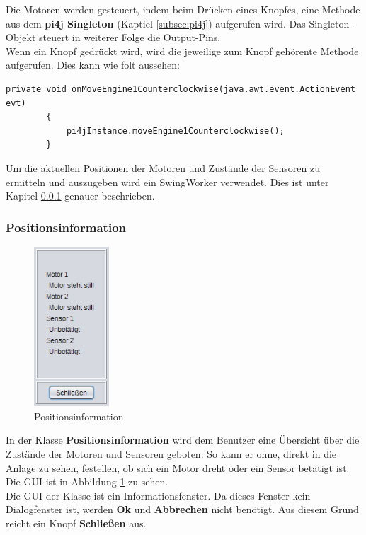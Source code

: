 Die Motoren werden gesteuert, indem beim Drücken eines Knopfes, eine Methode aus dem \textbf{pi4j Singleton} (Kaptiel \ref{subsec:pi4j}) aufgerufen wird. Das Singleton-Objekt steuert in weiterer Folge die Output-Pins.
\\ Wenn ein Knopf gedrückt wird, wird die jeweilige zum Knopf gehörente Methode aufgerufen. Dies kann wie folt aussehen:
\begin{lstlisting}[style=JavaStyle, caption=Motoren drehen] 
	private void onMoveEngine1Counterclockwise(java.awt.event.ActionEvent evt)                                               
    	{                                                   
        	pi4jInstance.moveEngine1Counterclockwise();
    	}  
\end{lstlisting}

\vspace{10pt}

Um die aktuellen Positionen der Motoren und Zustände der Sensoren zu ermitteln und auszugeben wird ein SwingWorker verwendet. Dies ist unter Kapitel \ref{subsubsec:Positionsinformation} genauer beschrieben.

\newpage

\subsubsection{Positionsinformation} \label{subsubsec:Positionsinformation}
\begin{figure}
\vspace{-20pt}
  \begin{center}
    \includegraphics[width=0.25\textwidth]{Bilder/GUI/Positionsinformation}
  \end{center}
  \caption{Positionsinformation}
  \label{Positionsinformation}
  \vspace{-10pt}
\end{figure}
In der Klasse \textbf{Positionsinformation} wird dem Benutzer eine Übersicht über die Zustände der Motoren und Sensoren geboten. So kann er ohne, direkt in die Anlage zu sehen, festellen, ob sich ein Motor dreht oder ein Sensor betätigt ist.
\\ Die GUI ist in Abbildung \ref{Positionsinformation} zu sehen.
\\ Die GUI der Klasse ist ein Informationsfenster. Da dieses Fenster kein Dialogfenster ist, werden \textbf{Ok} und \textbf{Abbrechen} nicht benötigt. Aus diesem Grund reicht ein Knopf \textbf{Schließen} aus.

